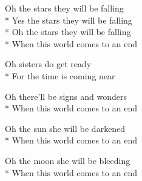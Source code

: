 
\contd
{}

\versemark
Oh the stars they will be falling\\*
Yes the stars they will be falling\\*
Oh the stars they will be falling\\*
When this world comes to an end

\versemark
Oh sisters do get ready\simile\\*
For the time is coming near

\versemark
Oh there'll be signs and wonders\simile\\*
When this world comes to an end

\versemark
Oh the sun she will be darkened\simile\\*
When this world comes to an end

\versemark
Oh the moon she will be bleeding\simile\\*
When this world comes to an end\repeatfirst[3, 1]

